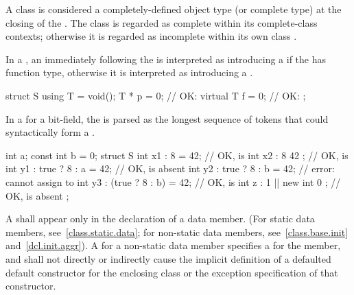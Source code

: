 \pnum
A class is considered a completely-defined object
type (or complete type) at the closing \tcode{\}} of
the .
The class is regarded as complete within its complete-class contexts;
otherwise it is regarded as incomplete within its own class
.

\pnum
In a ,
an \tcode{=} immediately following the 
is interpreted as introducing a 
if the  has function type,
otherwise it is interpreted as introducing
a .
\begin{example}
\begin{codeblock}
struct S {
  using T = void();
  T * p = 0;        // OK: 
  virtual T f = 0;  // OK: 
};
\end{codeblock}
\end{example}

\pnum
In a  for a bit-field,
the  is parsed as
the longest sequence of tokens
that could syntactically form a .
\begin{example}
\begin{codeblock}
int a;
const int b = 0;
struct S {
  int x1 : 8 = 42;              // OK,  is 
  int x2 : 8 { 42 };            // OK,  is 
  int y1 : true ? 8 : a = 42;   // OK,  is absent
  int y2 : true ? 8 : b = 42;   // error: cannot assign to 
  int y3 : (true ? 8 : b) = 42; // OK,  is 
  int z : 1 || new int { 0 };   // OK,  is absent
};
\end{codeblock}
\end{example}

\pnum
A  shall appear only in the
declaration of a data member. (For static data members,
see~\ref{class.static.data}; for non-static data members,
see~\ref{class.base.init} and~\ref{dcl.init.aggr}).
A  for a non-static data member
%
specifies a  for the member, and
shall not directly or indirectly cause the implicit definition of a
defaulted default constructor for the enclosing class or the
exception specification of that constructor.

